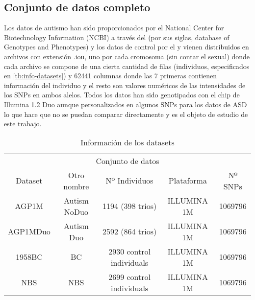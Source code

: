 \subsection{Conjunto de datos completo}
Los datos de autismo han sido proporcionados por el  National Center for Biotechnology Information (NCBI) a través del \href{https://www.ncbi.nlm.nih.gov/gap/}{\color{blue}{dbGaP}} (por sus siglas, database of Genotypes and Phenotypes) y los datos de control por el \href{https://ega-archive.org/}{\color{blue}{European Genome-Phenome Archive (EGA)}} y vienen distribuidos en archivos con extensión .iou, uno por cada cromosoma (sin contar el sexual) donde cada archivo se compone de una cierta cantidad de filas (individuos, especificados en \autoref{tb:info-datasets}) y 62441 columnas donde las 7 primeras contienen información del individuo y el resto son valores numéricos de las intensidades de los SNPs en ambos alelos. Todos los datos han sido genotipados con el chip de Illumina 1.2 Duo aunque personalizados en algunos SNPs para los datos de ASD lo que hace que no se puedan comparar directamente y es el objeto de estudio de este trabajo.

\begin{table}[H]
  \centering
  \begin{tabular}{ccccc} \toprule
    \multicolumn{5}{c}{Conjunto de datos} \\ \cmidrule(r){1-5}
    Dataset & Otro nombre & Nº Individuos & Plataforma & Nº SNPs          \\ \midrule
    AGP1M & Autism NoDuo & 1194 (398 trios) & ILLUMINA 1M & 1069796          \\ 
    AGP1MDuo & Autism Duo & 2592 (864 trios) & ILLUMINA 1M & 1069796          \\ 
    1958BC & BC & 2930 control individuals & ILLUMINA 1M & 1069796          \\
    NBS & NBS & 2699 control individuals & ILLUMINA 1M & 1069796          \\ \bottomrule
  \end{tabular}
  \caption{Información de los datasets}
  \label{tb:info-datasets}
\end{table}

